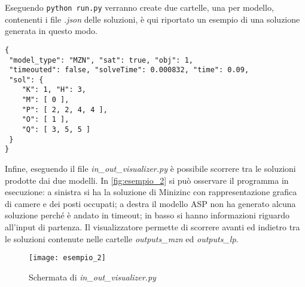 Eseguendo \lstinline{python run.py} verranno create due cartelle, una per modello, contenenti i file \emph{.json} delle soluzioni, è qui riportato un esempio di una soluzione generata in questo modo.
\begin{lstlisting}
{
 "model_type": "MZN", "sat": true, "obj": 1,      
 "timeouted": false, "solveTime": 0.000832, "time": 0.09,
 "sol": {
    "K": 1, "H": 3,
    "M": [ 0 ],
    "P": [ 2, 2, 4, 4 ],
    "O": [ 1 ],
    "Q": [ 3, 5, 5 ]
 }
}
\end{lstlisting}
Infine, eseguendo il file \emph{in\_out\_visualizer.py} è possibile scorrere tra le soluzioni prodotte dai due modelli.
In \autoref{fig:esempio_2} si può osservare il programma in esecuzione:
a sinistra si ha la soluzione di Minizinc con rappresentazione grafica di camere e dei posti occupati;
a destra il modello ASP non ha generato alcuna soluzione perché è andato in timeout;
in basso si hanno informazioni riguardo all'input di partenza.
Il visualizzatore permette di scorrere avanti ed indietro tra le soluzioni contenute nelle cartelle \emph{outputs\_mzn} ed \emph{outputs\_lp}.
\begin{figure}[ht]
  \centering
  \texttt{[image: esempio\_2]}
  \caption{Schermata di \emph{in\_out\_visualizer.py}}
  \label{fig:esempio_2}
\end{figure}

